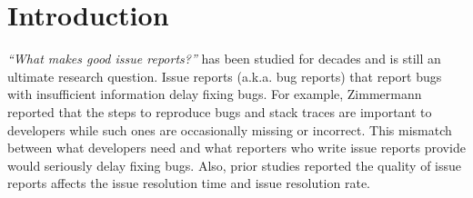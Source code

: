 \section{Introduction}
\label{sec:intro}
{\it ``What makes good issue reports?''} has been studied for decades and 
is still an ultimate research question. 
Issue reports (a.k.a. bug reports) that report bugs with 
insufficient information delay fixing bugs. 
For example, Zimmermann~\et~\citep{zimmermann2010TSE} reported 
that the steps to reproduce bugs and stack traces are important 
to developers while such ones are occasionally missing or incorrect. 
This mismatch between what developers need and 
what reporters who write issue reports provide would seriously delay fixing bugs. 
Also, prior studies reported the quality of issue reports affects 
the issue resolution time and 
issue resolution rate. 





